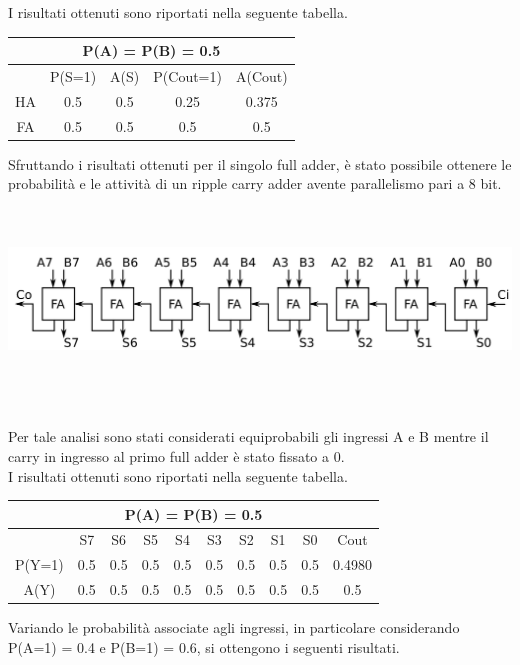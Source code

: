 \documentclass[11pt,  english, makeidx, a4paper, titlepage, oneside]{book}
\begin{document}
I risultati ottenuti sono riportati nella seguente tabella.
\vspace{0.3cm}
\begin{center}
	\begin{tabular}{|c|c|c|c|c|}
	\hline
	\multicolumn{5}{|c|}{P(A) = P(B) = 0.5  }\\
	\hline
	  & P(S=1) & A(S) & P(Cout=1) & A(Cout) \\ 
	\hline
	HA & 0.5 & 0.5 & 0.25 & 0.375 \\
	\hline
	FA & 0.5 & 0.5 & 0.5 & 0.5 \\
	\hline
	\end{tabular}
\end{center}
\vspace{0.3cm}
Sfruttando i risultati ottenuti per il singolo full adder, è stato possibile ottenere le probabilità e le attività di un ripple carry adder avente parallelismo pari a 8 bit.
\\\\\\
\centerline{\includegraphics[width=15cm]{./img/Lab_1/Es_2/RCA_8_bit.png}}
\\\\\\
Per tale analisi sono stati considerati equiprobabili gli ingressi A e B mentre il carry in ingresso al primo full adder è stato fissato a 0.\\
I risultati ottenuti sono riportati nella seguente tabella.
\vspace{0.3cm}
\begin{center}
\begin{tabular}{|c|c|c|c|c|c|c|c|c|c|}
\hline
\multicolumn{10}{|c|}{P(A) = P(B) = 0.5}\\
\hline
 & S7 & S6 & S5 & S4 & S3 & S2 & S1 & S0 & Cout \\
\hline
P(Y=1) & 0.5 & 0.5 & 0.5 & 0.5 & 0.5 & 0.5 & 0.5 & 0.5 & 0.4980 \\
\hline
A(Y) & 0.5 & 0.5 & 0.5 & 0.5 & 0.5 & 0.5 & 0.5 & 0.5 & 0.5 \\
\hline
\end{tabular}
\end{center}
\vspace{0.3cm}
Variando le probabilità associate agli ingressi, in particolare considerando P(A=1) = 0.4 e P(B=1) = 0.6, si ottengono i seguenti risultati.
\end{document}
